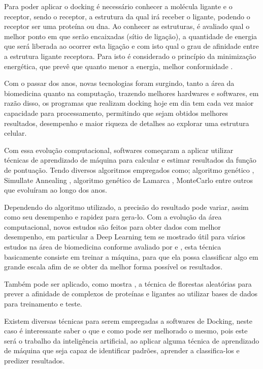 \documentclass[tcc, capa]{texucpel}
\begin{document}
Para poder aplicar o docking é necessário conhecer a molécula ligante e o receptor, sendo o receptor, a estrutura da qual irá receber o ligante, podendo o receptor ser uma proteína ou dna. 
Ao conhecer as estruturas, é avaliado qual o melhor ponto em que serão encaixadas (sítio de ligação), a quantidade de energia que será liberada ao ocorrer esta ligação e com isto qual o grau de afinidade entre a estrutura ligante receptora. Para isto é considerado o princípio da minimização energética, que prevê que quanto menor a energia, melhor conformidade \cite{kitchen2004docking}.

Com o passar dos anos, novas tecnologias foram surgindo, tanto a área da biomedicina quanto na computação,  trazendo melhores hardwares e softwares, em razão disso, os programas que realizam docking hoje em dia tem cada vez maior capacidade para processamento, permitindo que sejam obtidos melhores resultados, desempenho e maior riqueza de detalhes ao explorar uma estrutura celular.

Com essa evolução computacional, softwares começaram a aplicar utilizar técnicas de aprendizado de máquina para calcular e estimar resultados da função de pontuação.
Tendo diversos algoritmos empregados como; algoritmo genético \cite{holland1975adaptation},  Simullate Annealing \cite{kirkpatrick1984optimization}, algoritmo genético de Lamarca \cite{morris1998automated},  MonteCarlo \cite{caflisch1992monte} entre outros que evoluíram ao longo dos anos. 

Dependendo do algoritmo utilizado, a precisão do resultado pode variar, assim como seu desempenho e rapidez para gera-lo.
Com a evolução da área computacional, novos estudos são feitos para obter dados com melhor desempenho, em particular a Deep Learning tem se mostrado útil para vários estudos na área de biomedicina conforme avaliado por \cite{korotcov2017comparison} e \cite{mamoshina2016applications}, esta técnica basicamente consiste em treinar a máquina, para que ela possa classificar algo em grande escala afim de se obter da melhor forma possível  os resultados.

Também  pode ser aplicado, como mostra \cite{ballester2010machine}, a técnica de florestas aleatórias para prever a afinidade de complexos de proteínas e ligantes ao utilizar bases de dados para treinamento e teste.

Existem diversas técnicas para serem empregadas a softwares de Docking, neste caso é interessante saber o que e como pode ser melhorado o mesmo, pois este será o trabalho da inteligência artificial, ao aplicar alguma técnica de aprendizado de máquina que seja capaz de identificar padrões, aprender a classifica-los e predizer resultados.
\end{document}
